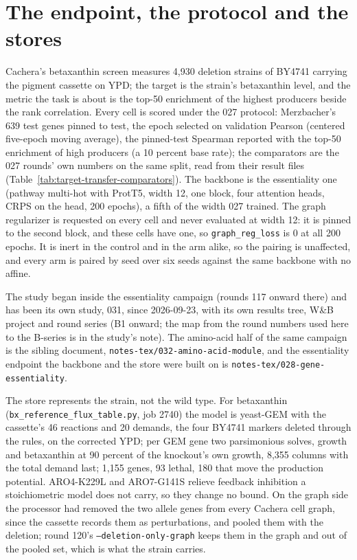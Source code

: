 \section{The endpoint, the protocol and the stores}
\label{sec:endpoint}

Cachera's betaxanthin screen measures 4,930 deletion strains of BY4741 carrying the
pigment cassette on YPD; the target is the strain's betaxanthin level, and the metric
the task is about is the top-50 enrichment of the highest producers beside the rank
correlation. Every cell is scored under the 027 protocol: Merzbacher's 639 test genes
pinned to test, the epoch selected on validation Pearson (centered five-epoch moving
average), the pinned-test Spearman reported with the top-50 enrichment of high producers
(a 10 percent base rate); the comparators are the 027 rounds' own numbers on the same
split, read from their result files (Table~\ref{tab:target-transfer-comparators}). The
backbone is the essentiality one (pathway multi-hot with ProtT5, width 12, one block,
four attention heads, CRPS on the head, 200 epochs), a fifth of the width 027 trained.
The graph regularizer is requested on every cell and never evaluated at width 12: it is
pinned to the second block, and these cells have one, so \texttt{graph\_reg\_loss} is 0
at all 200 epochs. It is inert in the control and in the arm alike, so the pairing is
unaffected, and every arm is paired by seed over six seeds against the same backbone with
no affine.

The study began inside the essentiality campaign (rounds 117 onward there) and has been
its own study, 031, since 2026-09-23, with its own results tree, W\&B project and round
series (B1 onward; the map from the round numbers used here to the B-series is in the
study's note). The amino-acid half of the same campaign is the sibling document,
\texttt{notes-tex/032-amino-acid-module}, and the essentiality endpoint the backbone and
the store were built on is \texttt{notes-tex/028-gene-essentiality}.

The store represents the strain, not the wild type. For betaxanthin
(\texttt{bx\_reference\_flux\_table.py}, job 2740) the model is yeast-GEM with the
cassette's 46 reactions and 20 demands, the four BY4741 markers deleted through the
rules, on the corrected YPD; per GEM gene two parsimonious solves, growth and
betaxanthin at 90 percent of the knockout's own growth, 8,355 columns with the total
demand last; 1,155 genes, 93 lethal, 180 that move the production potential. ARO4-K229L
and ARO7-G141S relieve feedback inhibition a stoichiometric model does not carry, so
they change no bound. On the graph side the processor had removed the two allele genes
from every Cachera cell graph, since the cassette records them as perturbations, and
pooled them with the deletion; round 120's \texttt{--deletion-only-graph} keeps them in
the graph and out of the pooled set, which is what the strain carries.
